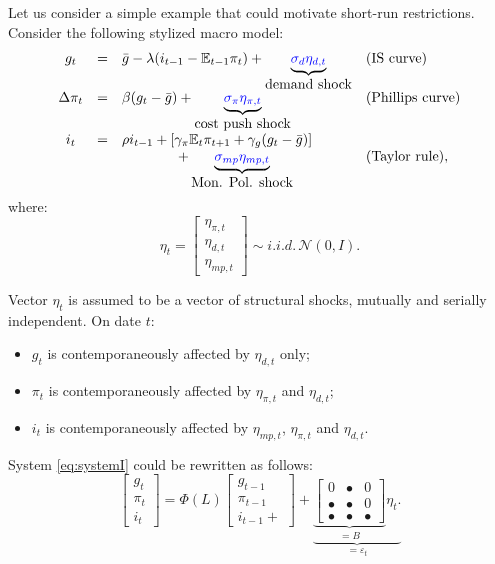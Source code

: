 \documentclass[
  12pt,
]{book}
\providecommand{\tightlist}{%
  \setlength{\itemsep}{0pt}\setlength{\parskip}{0pt}}
\theoremstyle{definition}
\theoremstyle{definition}
\theoremstyle{definition}
\theoremstyle{definition}
\theoremstyle{remark}
\begin{document}
Let us consider a simple example that could motivate short-run restrictions. Consider the following stylized macro model:
\begin{equation}
\begin{array}{clll}
g_{t}&=& \bar{g}-\lambda(i_{t-1}-\mathbb{E}_{t-1}\pi_{t})+ \underbrace{{\color{blue}\sigma_d \eta_{d,t}}}_{\mbox{demand shock}}& (\mbox{IS curve})\\
\Delta \pi_{t} & = & \beta (g_{t} - \bar{g})+ \underbrace{{\color{blue}\sigma_{\pi} \eta_{\pi,t}}}_{\mbox{cost push shock}} & (\mbox{Phillips curve})\\
i_{t} & = & \rho i_{t-1} + \left[ \gamma_\pi \mathbb{E}_{t}\pi_{t+1}  + \gamma_g (g_{t} - \bar{g}) \right]\\
&& \qquad \qquad+\underbrace{{\color{blue}\sigma_{mp} \eta_{mp,t}}}_{\mbox{Mon. Pol. shock}} & (\mbox{Taylor rule}),
\end{array}\label{eq:systemI}
\end{equation}
where:
\begin{equation}
\eta_t = 
\left[
\begin{array}{c}
\eta_{\pi,t}\\
\eta_{d,t}\\
\eta_{mp,t}
\end{array}
\right]
\sim i.i.d.\,\mathcal{N}(0,I).\label{eq:covU}
\end{equation}

Vector \(\eta_t\) is assumed to be a vector of structural shocks, mutually and serially independent. On date \(t\):

\begin{itemize}
\tightlist
\item
  \(g_t\) is contemporaneously affected by \(\eta_{d,t}\) only;
\item
  \(\pi_t\) is contemporaneously affected by \(\eta_{\pi,t}\) and \(\eta_{d,t}\);
\item
  \(i_t\) is contemporaneously affected by \(\eta_{mp,t}\), \(\eta_{\pi,t}\) and \(\eta_{d,t}\).
\end{itemize}

System \eqref{eq:systemI} could be rewritten as follows:
\begin{equation}
\left[\begin{array}{c}
g_t\\
\pi_t\\
i_t
\end{array}\right]
= \Phi(L)
\left[\begin{array}{c}
g_{t-1}\\
\pi_{t-1}\\
i_{t-1} +
\end{array}\right] +\underbrace{\underbrace{
\left[
\begin{array}{ccc}
0 & \bullet & 0 \\
\bullet & \bullet & 0 \\
\bullet & \bullet & \bullet
\end{array}
\right]}_{=B} \eta_t.}_{=\varepsilon_t}\label{eq:BBBB}
\end{equation}
\end{document}
